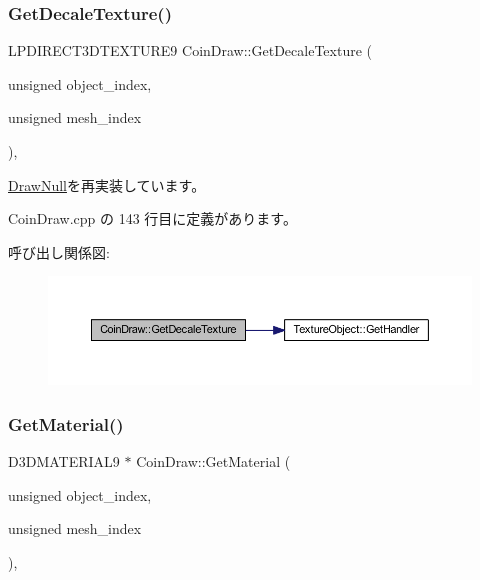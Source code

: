 \subsubsection{\texorpdfstring{Get\+Decale\+Texture()}{GetDecaleTexture()}}
{\footnotesize\ttfamily L\+P\+D\+I\+R\+E\+C\+T3\+D\+T\+E\+X\+T\+U\+R\+E9 Coin\+Draw\+::\+Get\+Decale\+Texture (\begin{DoxyParamCaption}\item[{unsigned}]{object\+\_\+index,  }\item[{unsigned}]{mesh\+\_\+index }\end{DoxyParamCaption})\hspace{0.3cm}{\ttfamily [override]}, {\ttfamily [virtual]}}



\mbox{\hyperlink{class_draw_null_a8496ed1b1f765a331a8f1704122b8ca4}{Draw\+Null}}を再実装しています。



 Coin\+Draw.\+cpp の 143 行目に定義があります。

呼び出し関係図\+:\nopagebreak
\begin{figure}[H]
\begin{center}
\leavevmode
\includegraphics[width=350pt]{class_coin_draw_a1d4ab1a5c480833b8d8e7fe226136ad5_cgraph}
\end{center}
\end{figure}
\mbox{\label{class_coin_draw_a869a6b7273b273048dd56822fae4d644}} 
\subsubsection{\texorpdfstring{Get\+Material()}{GetMaterial()}}
{\footnotesize\ttfamily D3\+D\+M\+A\+T\+E\+R\+I\+A\+L9 $\ast$ Coin\+Draw\+::\+Get\+Material (\begin{DoxyParamCaption}\item[{unsigned}]{object\+\_\+index,  }\item[{unsigned}]{mesh\+\_\+index }\end{DoxyParamCaption})\hspace{0.3cm}{\ttfamily [override]}, {\ttfamily [virtual]}}




